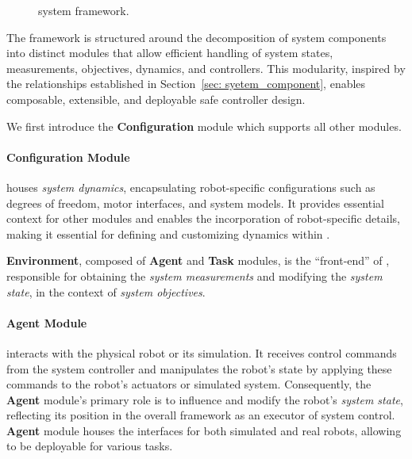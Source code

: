 \begin{figure}[htbp]
    \centering
    \vspace{2.5cm}  %
    \vspace{2cm}
    \caption{\spark system framework.}
    \label{fig:system_framework}
\end{figure}



The \spark framework is structured around the decomposition of system components into distinct modules that allow efficient handling of system states, measurements, objectives, dynamics, and controllers. 
This modularity, inspired by the relationships established in Section~\ref{sec: syetem_component}, enables composable, extensible, and deployable safe controller design. 

We first introduce the \textbf{Configuration} module which supports all other modules.

\paragraph{\textbf{Configuration Module}} houses \textit{system dynamics}, encapsulating robot-specific configurations such as degrees of freedom, motor interfaces, and system models. 
It provides essential context for other modules and enables the incorporation of robot-specific details, making it essential for defining and customizing dynamics within \spark. 

\textbf{Environment}, composed of \textbf{Agent} and \textbf{Task} modules, is the ``front-end'' of \spark, responsible for obtaining the \textit{system measurements} and modifying the \textit{system state}, in the context of \textit{system objectives}. 

\paragraph{\textbf{Agent Module}} interacts with the physical robot or its simulation. 
It receives control commands from the system controller and manipulates the robot’s state by applying these commands to the robot’s actuators or simulated system. 
Consequently, the \textbf{Agent} module’s primary role is to influence and modify the robot’s \textit{system state}, reflecting its position in the overall framework as an executor of system control. 
\textbf{Agent} module houses the interfaces for both simulated and real robots, allowing \spark to be deployable for various tasks.

